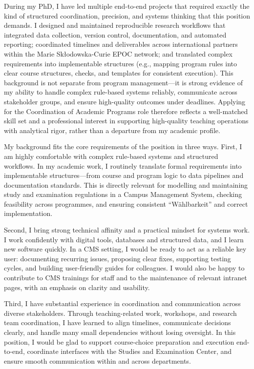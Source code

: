 \documentclass[11pt]{article}
\begin{document}
During my PhD, I have led multiple end-to-end projects that required exactly the kind of structured coordination, precision, and systems thinking that this position demands. I designed and maintained reproducible research workflows that integrated data collection, version control, documentation, and automated reporting; coordinated timelines and deliverables across international partners within the Marie Skłodowska-Curie EPOC network; and translated complex requirements into implementable structures (e.g., mapping program rules into clear course structures, checks, and templates for consistent execution). This background is not separate from program management—it is strong evidence of my ability to handle complex rule-based systems reliably, communicate across stakeholder groups, and ensure high-quality outcomes under deadlines. Applying for the Coordination of Academic Programs role therefore reflects a well-matched skill set and a professional interest in supporting high-quality teaching operations with analytical rigor, rather than a departure from my academic profile.

My background fits the core requirements of the position in three ways. 
First, I am highly comfortable with complex rule-based systems and structured workflows. 
In my academic work, I routinely translate formal requirements into implementable structures---from course and program logic to data pipelines and documentation standards. 
This is directly relevant for modelling and maintaining study and examination regulations in a Campus Management System, checking feasibility across programmes, and ensuring consistent ``W\"ahlbarkeit'' and correct implementation.

Second, I bring strong technical affinity and a practical mindset for systems work. 
I work confidently with digital tools, databases and structured data, and I learn new software quickly. 
In a CMS setting, I would be ready to act as a reliable key user: documenting recurring issues, proposing clear fixes, supporting testing cycles, and building user-friendly guides for colleagues. 
I would also be happy to contribute to CMS trainings for staff and to the maintenance of relevant intranet pages, with an emphasis on clarity and usability.

Third, I have substantial experience in coordination and communication across diverse stakeholders. 
Through teaching-related work, workshops, and research team coordination, I have learned to align timelines, communicate decisions clearly, and handle many small dependencies without losing oversight. 
In this position, I would be glad to support course-choice preparation and execution end-to-end, coordinate interfaces with the Studies and Examination Center, and ensure smooth communication within and across departments.
\end{document}
